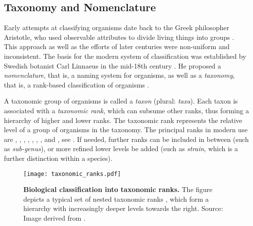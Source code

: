 


\subsection{Taxonomy and Nomenclature}
\label{ch:Foundations:sec:TreeOfLife:sub:TaxonomyNomenclature}

Early attempts at classifying organisms date back to the Greek philosopher Aristotle,
who used observable attributes to divide living things into groups \cite{Leroi2014}.
This approach as well as the efforts of later centuries were non-uniform and inconsistent.
The basis for the modern system of classification was established
by Swedish botanist Carl Linnaeus in the mid-18th century \cite{Donk1957}.
He proposed a \emph{nomenclature}, that is, a naming system for organisms,
as well as a \emph{taxonomy}, that is, a rank-based classification of organisms \cite{Linnaeus1735,Linnaeus1753}.

A taxonomic group of organisms is called a \emph{taxon} (plural: \emph{taxa}).
Each taxon is associated with a \emph{taxonomic rank}, which can subsume other ranks,
thus forming a hierarchy of higher and lower ranks.
The taxonomic rank represents the relative level of a group of organisms in the taxonomy.
The principal ranks in modern use are , , , ,
, , , and ,
see .
If needed, further ranks can be included in between (such as \emph{sub-genus}),
or more refined lower levels be added (such as \emph{strain}, which is a further distinction within a species).

\begin{figure}[hpbt]
    \centering
    \texttt{[image: taxonomic\_ranks.pdf]}
    \caption[Biological classification into taxonomic ranks]{
        \textbf{Biological classification into taxonomic ranks.}
        The figure depicts a typical set of nested taxonomic ranks \cite{Woese1990},
        which form a hierarchy with increasingly deeper levels towards the right.
        Source: Image derived from \cite{Halasz2007}.
    }
    \label{fig:taxonomic_ranks}
\end{figure}

